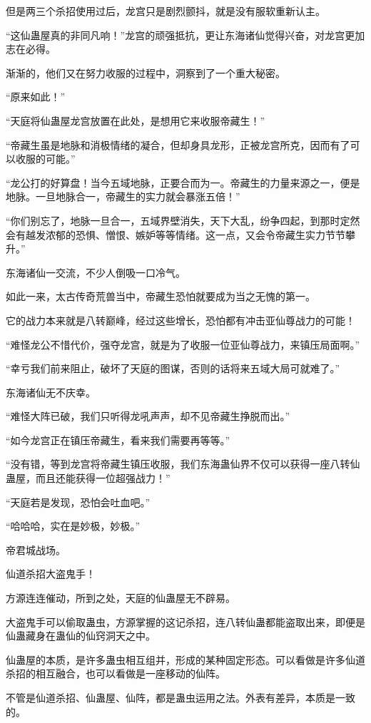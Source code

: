 \begin{this_body}
但是两三个杀招使用过后，龙宫只是剧烈颤抖，就是没有服软重新认主。

“这仙蛊屋真的非同凡响！”龙宫的顽强抵抗，更让东海诸仙觉得兴奋，对龙宫更加志在必得。

渐渐的，他们又在努力收服的过程中，洞察到了一个重大秘密。

“原来如此！”

“天庭将仙蛊屋龙宫放置在此处，是想用它来收服帝藏生！”

“帝藏生虽是地脉和消极情绪的凝合，但却身具龙形，正被龙宫所克，因而有了可以收服的可能。”

“龙公打的好算盘！当今五域地脉，正要合而为一。帝藏生的力量来源之一，便是地脉。一旦地脉合一，帝藏生的实力就会暴涨五倍！”

“你们别忘了，地脉一旦合一，五域界壁消失，天下大乱，纷争四起，到那时定然会有越发浓郁的恐惧、憎恨、嫉妒等等情绪。这一点，又会令帝藏生实力节节攀升。”

东海诸仙一交流，不少人倒吸一口冷气。

如此一来，太古传奇荒兽当中，帝藏生恐怕就要成为当之无愧的第一。

它的战力本来就是八转巅峰，经过这些增长，恐怕都有冲击亚仙尊战力的可能！

“难怪龙公不惜代价，强夺龙宫，就是为了收服一位亚仙尊战力，来镇压局面啊。”

“幸亏我们前来阻止，破坏了天庭的图谋，否则的话将来五域大局可就难了。”

东海诸仙无不庆幸。

“难怪大阵已破，我们只听得龙吼声声，却不见帝藏生挣脱而出。”

“如今龙宫正在镇压帝藏生，看来我们需要再等等。”

“没有错，等到龙宫将帝藏生镇压收服，我们东海蛊仙界不仅可以获得一座八转仙蛊屋，而且还能获得一位超强战力！”

“天庭若是发现，恐怕会吐血吧。”

“哈哈哈，实在是妙极，妙极。”

帝君城战场。

仙道杀招大盗鬼手！

方源连连催动，所到之处，天庭的仙蛊屋无不辟易。

大盗鬼手可以偷取蛊虫，方源掌握的这记杀招，连八转仙蛊都能盗取出来，即便是仙蛊藏身在蛊仙的仙窍洞天之中。

仙蛊屋的本质，是许多蛊虫相互组并，形成的某种固定形态。可以看做是许多仙道杀招的相互融合，也可以看做是一座移动的仙阵。

不管是仙道杀招、仙蛊屋、仙阵，都是蛊虫运用之法。外表有差异，本质是一致的。


\end{this_body}
